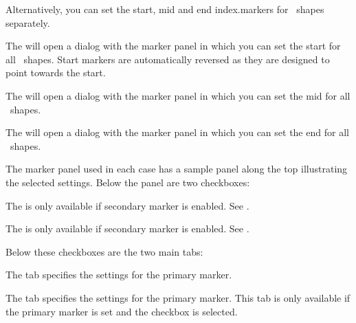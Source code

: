Alternatively, you can set the start, mid and end
\glspl{index.marker} for \selected\ shapes separately.


The  will open a dialog with the
marker panel in which you can set the start  for
all \selected\ shapes. Start markers are automatically reversed as
they are designed to point towards the start.


The  will open a dialog with the
marker panel in which you can set the mid  for
all \selected\ shapes.


The  will open a dialog with the
marker panel in which you can set the end  for
all \selected\ shapes.

The marker panel used in each case has a sample panel along the top
illustrating the selected settings. Below the panel are two
checkboxes:


The  is only available if secondary marker
is enabled. See .


The  is only available if secondary marker
is enabled. See .

Below these checkboxes are the two main tabs:


The  tab specifies the settings for the
primary marker.


The  tab specifies the settings for the
primary marker. This tab is only available if the primary marker is
set and the  checkbox is selected.

